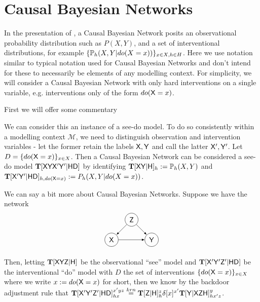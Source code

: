 

\section{Causal Bayesian Networks}\label{sec:CBN}

In the presentation of \citet{pearl_causality:_2009}, a Causal Bayesian Network posits an observational probability distribution such as $P(X,Y)$, and a set of interventional distributions, for example $\{\mathbb{P}_h(X,Y|do(X=x))\}_{x\in X,h\in H}$. Here we use notation similar to typical notation used for Causal Bayesian Networks and don't intend for these to necessarily be elements of any modelling context. For simplicity, we will consider a Causal Bayesian Network with only hard interventions on a single variable, e.g. interventions only of the form $do(\mathsf{X}=x)$.

First we will offer some commentary



We can consider this an instance of a see-do model. To do so consistently within a modelling context $\mathscr{M}$, we need to distinguish observation and intervention variables - let the former retain the labels $\mathsf{X},\mathsf{Y}$ and call the latter $\mathsf{X}',\mathsf{Y}'$. Let $D=\{do(\mathsf{X}=x)\}_{x\in X}$. Then a Causal Bayesian Network can be considered a see-do model $\mathbf{T}[\mathsf{XYX'Y'}|\mathsf{HD}]$ by identifying $\mathbf{T}[\mathsf{XY}|\mathsf{H}]_h := \mathbb{P}_h(X,Y)$ and $\mathbf{T}[\mathsf{X'Y'}|\mathsf{HD}]_{h,do(\mathsf{X}=x)}:={P}_h(X,Y|do(X=x))$.


We can say a bit more about Causal Bayesian Networks. Suppose we have the network
\begin{align*}
\begin{tikzpicture}
    \path (0,0) node[draw,circle] (X) {$\RV{X}$}
    ++ (1,1) node[draw,circle] (Z) {$\RV{Z}$}
    ++ (1,-1) node[draw, circle] (Y) {$\RV{Y}$};
    \draw[-latex] (X)--(Y);
    \draw[-latex] (Z) -- (Y);
    \draw[-latex] (Z) -- (X);
\end{tikzpicture}
\end{align*}

Then, letting $\mathbf{T}[\mathsf{XYZ}|\mathsf{H}]$ be the observational ``see'' model and $\mathbf{T}[\mathsf{X'Y'Z'}|\mathsf{HD}]$ be the interventional ``do'' model with $D$ the set of interventions $\{do(\mathsf{X}=x)\}_{x\in X}$ where we write $x:=do(\mathsf{X}=x)$ for short, then we know by the backdoor adjustment rule that $\mathbf{T}[\mathsf{X'Y'Z'}|\mathsf{HD}]_{hx}^{x'yz} \overset{krn}{=} \mathbf{T}[\mathsf{Z}|\mathsf{H}]_h^z \delta[x]^{x'} \mathbf{T}[\mathsf{Y}|\mathsf{XZH}]_{hx'z}^y$. 

